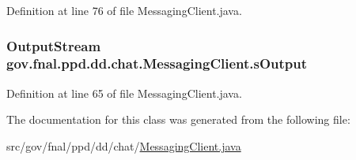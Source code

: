 Definition at line 76 of file Messaging\-Client.\-java.

\hypertarget{classgov_1_1fnal_1_1ppd_1_1dd_1_1chat_1_1MessagingClient_aad2bc447bb305f210db3d55142adc077}{
\subsubsection[{s\-Output}]{\setlength{\rightskip}{0pt plus 5cm}Output\-Stream gov.\-fnal.\-ppd.\-dd.\-chat.\-Messaging\-Client.\-s\-Output\hspace{0.3cm}{\ttfamily [protected]}}}\label{classgov_1_1fnal_1_1ppd_1_1dd_1_1chat_1_1MessagingClient_aad2bc447bb305f210db3d55142adc077}


Definition at line 65 of file Messaging\-Client.\-java.



The documentation for this class was generated from the following file\-:\begin{DoxyCompactItemize}
\item 
src/gov/fnal/ppd/dd/chat/\hyperlink{MessagingClient_8java}{Messaging\-Client.\-java}\end{DoxyCompactItemize}

